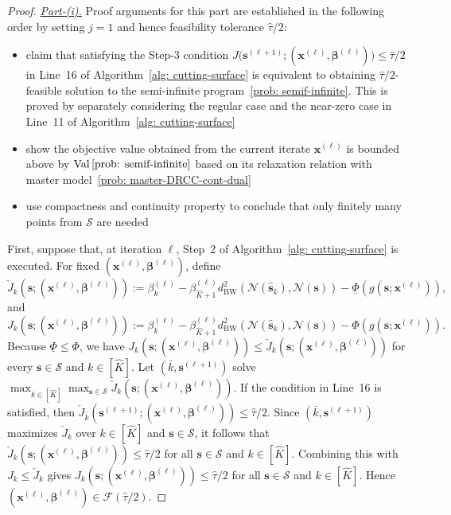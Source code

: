 \documentclass[opre,sglanonrev]{informs4}
\newcommand{\mF}{\mathcal{F}}
\newcommand{\mS}{\mathcal{S}}
\newcommand{\mN}{\mathcal{N}}
\newcommand{\bbeta}{\bm{\beta}}
\newcommand{\bs}{\bm{s}}
\newcommand{\bx}{\bm{x}}
\newcommand{\Val}{\operatorname{Val}}
\begin{document}
{\begin{proof}
\emph{\underline{Part-(i).}} Proof arguments for this part are established in the following order by setting $j=1$ and hence feasibility tolerance $\hat{\tau}/2$:
\begin{itemize}[leftmargin=1.0em]
    \item[--] claim that satisfying the Step-3 condition $J\bigl(\bs^{(\ell+1)};(\bx^{(\ell)},\bbeta^{(\ell)})\bigr)\le \hat{\tau}/2$ in Line~16 of Algorithm~\ref{alg: cutting-surface} is equivalent to obtaining $\hat{\tau}/2$-feasible solution to the semi-infinite program~\eqref{prob: semif-infinite}. This is proved by separately considering the regular case and the near-zero case in Line~11 of Algorithm~\ref{alg: cutting-surface}
\item[--]  show the objective value obtained from the current iterate $\bx^{(\ell)}$ is bounded above by \(\Val\eqref{prob: semif-infinite}\) based on its relaxation relation with master model~\eqref{prob: master-DRCC-cont-dual}
\item[--]  use compactness and continuity property to conclude that only finitely many points from \(\mS\) are needed
\end{itemize} 

First, suppose that, at iteration
\(\ell\), Step~2 of Algorithm~\ref{alg: cutting-surface} is executed. For
fixed \((\bx^{(\ell)},\bbeta^{(\ell)})\), define
\[
\check J_k(\bs;(\bx^{(\ell)},\bbeta^{(\ell)}))
:=
\beta_k^{(\ell)}
-
\beta_{\hat K+1}^{(\ell)}
d_{\mathrm{BW}}^2(\mN(\hat{\bs}_k),\mN(\bs))
-
\underline{\Phi}(g(\bs;\bx^{(\ell)})),
\]
and\vspace{-2em}
\[
J_k(\bs;(\bx^{(\ell)},\bbeta^{(\ell)}))
:=
\beta_k^{(\ell)}
-
\beta_{\hat K+1}^{(\ell)}
d_{\mathrm{BW}}^2(\mN(\hat{\bs}_k),\mN(\bs))
-
\Phi(g(\bs;\bx^{(\ell)})).
\]
Because \(\underline{\Phi}\le \Phi\), we have
\(J_k(\bs;(\bx^{(\ell)},\bbeta^{(\ell)}))
\le
\check J_k(\bs;(\bx^{(\ell)},\bbeta^{(\ell)}))\) for every
\(\bs\in\mS\) and \(k\in[\hat K]\). Let
\((\bar k,\bs^{(\ell+1)})\) solve $\max_{k\in[\hat K]}\max_{\bs\in\mS}
\check J_k(\bs;(\bx^{(\ell)},\bbeta^{(\ell)})).$
If the condition in Line~16 is satisfied, then
\(\check J_{\bar k}(\bs^{(\ell+1)};(\bx^{(\ell)},\bbeta^{(\ell)}))
\le \hat{\tau}/2\). Since \((\bar k,\bs^{(\ell+1)})\) maximizes
\(\check J_k\) over \(k\in[\hat K]\) and \(\bs\in\mS\), it follows that
\(\check J_k(\bs;(\bx^{(\ell)},\bbeta^{(\ell)}))\le\hat{\tau}/2\) for all
\(\bs\in\mS\) and \(k\in[\hat K]\). Combining this with \(J_k\le\check J_k\)
gives \(J_k(\bs;(\bx^{(\ell)},\bbeta^{(\ell)}))\le\hat{\tau}/2\) for all
\(\bs\in\mS\) and \(k\in[\hat K]\). Hence
\((\bx^{(\ell)},\bbeta^{(\ell)})\in\mF(\hat{\tau}/2)\).


\end{proof}}
\end{document}
